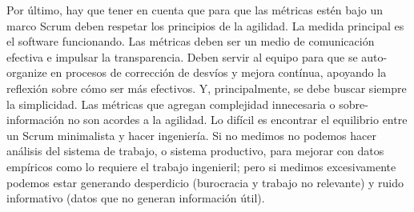 Por último, hay que tener en cuenta que para que las métricas estén bajo un marco Scrum deben respetar los principios de la agilidad. La medida principal es el software funcionando. Las métricas deben ser un medio de comunicación efectiva e impulsar la transparencia. Deben servir al equipo para que se auto-organize en procesos de corrección de desvíos y mejora contínua, apoyando la reflexión sobre cómo ser más efectivos. Y, principalmente, se debe buscar siempre la simplicidad. Las métricas que agregan complejidad innecesaria o sobre-información no son acordes a la agilidad. Lo difícil es encontrar el equilibrio entre un Scrum minimalista y hacer ingeniería. Si no medimos no podemos hacer análisis del sistema de trabajo, o sistema productivo, para mejorar con datos empíricos como lo requiere el trabajo ingenieril; pero si medimos excesivamente podemos estar generando desperdicio (burocracia y trabajo no relevante) y ruido informativo (datos que no generan información útil).
